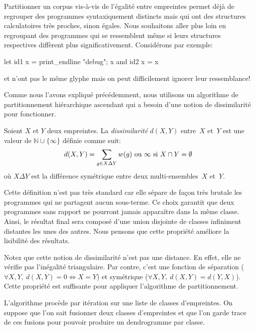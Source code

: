 
Partitionner un corpus vis-à-vis de l'égalité entre empreintes permet
déjà de regrouper des programmes syntaxiquement distincts mais qui ont
des structures calculatoires très proches, sinon égales. Nous
souhaitons aller plus loin en regroupant des programmes qui se
ressemblent même si leurs structures respectives diffèrent
plus significativement. Considérons par exemple:

\begin{ocaml}
let id1 x = print_endline "debug"; x and id2 x = x
\end{ocaml}
\noindent {} et  n'ont pas le même glyphe mais
on peut difficilement ignorer leur ressemblance!

Comme nous l'avons expliqué précédemment, nous utilisons un algorithme
de partitionnement hiérarchique ascendant qui a besoin d'une notion
de dissimilarité pour fonctionner.

\begin{defn}
Soient $X$ et $Y$ deux empreintes. La \textit{dissimilarité} $d(X, Y)$ entre~$X$ et~$Y$
est une valeur de $\mathbb{N} \cup \{ \infty \}$ définie comme suit:
\[
d (X,Y) = \sum\limits_{g \in X \Delta Y} w(g) \text{ ou }
	  \infty \text{ si $X \cap Y = \emptyset$} \\
\]
\noindent où $X \Delta Y$ est la différence symétrique entre deux multi-ensembles~$X$ et~$Y$.
\end{defn}

Cette définition n'est pas très standard car elle sépare de façon très
brutale les programmes qui ne partagent aucun sous-terme. Ce choix
garantit que deux programmes sans rapport ne pourront jamais
apparaître dans la même classe. Ainsi, le résultat final sera composé
d'une union disjointe de classes infiniment distantes les unes des
autres. Nous pensons que cette propriété améliore la lisibilité des
résultats.

Notez que cette notion de dissimilarité n'est pas une distance. En
effet, elle ne vérifie pas l'inégalité triangulaire. Par contre, c'est
une fonction de séparation ($\forall X,Y,\ d(X,Y) = 0 \iff X = Y$) et
symétrique ($\forall X,Y,\ d(X,Y) = d(Y,X)$). Cette propriété est
suffisante pour appliquer l'algorithme de partitionnement.

L'algorithme procède par itération sur une liste de classes
d'empreintes. On suppose que l'on sait fusionner deux classes
d'empreintes et que l'on garde trace de ces fusions pour pouvoir
produire un dendrogramme par classe.


